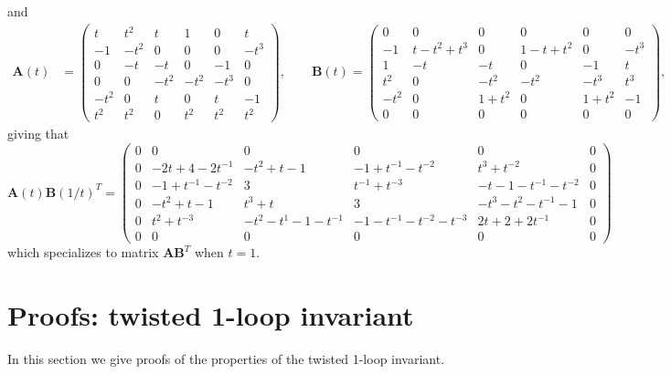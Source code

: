\documentclass[12pt,reqno]{amsart}
\theoremstyle{definition}
\begin{document}
and
{\tiny
\begin{align}
\label{ABt63}  
\mathbf{A}(t)&= \begin{pmatrix}
t& t^2 & t & 1 & 0 & t \\
-1 & -t^2 & 0 & 0 & 0 & -t^3 \\
0 & -t & -t & 0 & -1 & 0 \\
0 & 0 & -t^2 & -t^2 & -t^3 & 0 \\
-t^2  & 0 & t & 0 & t & -1 	\\
t^2 & t^2 & 0 & t^2 & t^2 & t^2
\end{pmatrix},
\qquad
\mathbf{B}(t) = \begin{pmatrix}
0 & 0 & 0 & 0 & 0 & 0 \\
-1 & t-t^2+t^3  & 0 & 1-t+t^2 & 0 & -t^3 \\
1 & -t & -t & 0 & -1 & t \\
t^2& 0 & -t^2 & -t^2 & -t^3 & t^3 \\
-t^2 & 0 & 1+t^2 & 0 & 1+t^2 & -1 	\\
0 & 0 & 0 & 0 & 0 & 0
\end{pmatrix}, 
\end{align}
}
giving that
{\tiny
\[
\mathbf{A}(t)\mathbf{B}(1/t)^T =
\begin{pmatrix}
  0 & 0 & 0 & 0 & 0 & 0 \\
  0 & -2t+4-2 t^{-1} & -t^2+t- 1 & -1+t^{-1}- t^{-2} & t^{3}+t^{-2} & 0 \\
  0 & -1+t^{-1}- t^{-2} & 3 & t^{-1}+ t^{-3} & -t-1 -t^{-1}-t^{-2} & 0 \\
  0 & -t^2+t-1 & t^3 + t & 3 & -t^{3}-t^{2} -t^{-1}-1 & 0 \\
  0 & t^{2}+t^{-3} & -t^{2}-t^{1} -1-t^{-1}
  & -1-t^{-1} -t^{-2}-t^{-3} & 2t+2+2 t^{-1}& 0 \\
  0 & 0 & 0 & 0 & 0 & 0 
\end{pmatrix}
\]
}
which specializes to matrix $\mathbf{A} \mathbf{B}^T$ when $t=1$.


\section{Proofs: twisted 1-loop invariant}
\label{sec.part2}

In this section we give proofs of the properties of the twisted 1-loop invariant.
\end{document}
